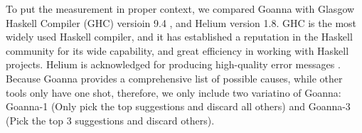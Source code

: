 \documentclass[pdflatex,sn-mathphys-num]{sn-jnl}%
\begin{document}
  To put the measurement in proper context, we compared Goanna with Glasgow Haskell Compiler (GHC) versioin 9.4 \cite{Gamari_undated-zu}, and Helium \cite{Hage2023-kk} version 1.8. GHC is the most widely used Haskell compiler, and it has established a reputation in the Haskell community for its wide capability, and great efficiency in working with Haskell projects. Helium is acknowledged for producing high-quality error messages \cite{Heeren2003-kd}. Because Goanna provides a comprehensive list of possible causes, while other tools only have one shot, therefore, we only include two variatino of Goanna: Goanna-1 (Only pick the top suggestions and discard all others) and Goanna-3 (Pick the top 3 suggestions and discard others).



\end{document}

